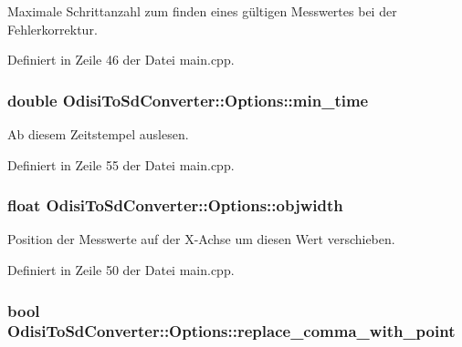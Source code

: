 Maximale Schrittanzahl zum finden eines gültigen Messwertes bei der Fehlerkorrektur. 



Definiert in Zeile 46 der Datei main.\-cpp.

\hypertarget{structOdisiToSdConverter_1_1Options_a2c97daa31cfdd315fd1d9a3307665edb}{
\subsubsection[{min\-\_\-time}]{\setlength{\rightskip}{0pt plus 5cm}double Odisi\-To\-Sd\-Converter\-::\-Options\-::min\-\_\-time}}\label{structOdisiToSdConverter_1_1Options_a2c97daa31cfdd315fd1d9a3307665edb}


Ab diesem Zeitstempel auslesen. 



Definiert in Zeile 55 der Datei main.\-cpp.

\hypertarget{structOdisiToSdConverter_1_1Options_a88d153166692e5bb6a4a37d453b2193c}{
\subsubsection[{objwidth}]{\setlength{\rightskip}{0pt plus 5cm}float Odisi\-To\-Sd\-Converter\-::\-Options\-::objwidth}}\label{structOdisiToSdConverter_1_1Options_a88d153166692e5bb6a4a37d453b2193c}


Position der Messwerte auf der X-\/\-Achse um diesen Wert verschieben. 



Definiert in Zeile 50 der Datei main.\-cpp.

\hypertarget{structOdisiToSdConverter_1_1Options_ad5adb03bbad593944fb94802f9efffe1}{
\subsubsection[{replace\-\_\-comma\-\_\-with\-\_\-point}]{\setlength{\rightskip}{0pt plus 5cm}bool Odisi\-To\-Sd\-Converter\-::\-Options\-::replace\-\_\-comma\-\_\-with\-\_\-point}}\label{structOdisiToSdConverter_1_1Options_ad5adb03bbad593944fb94802f9efffe1}


